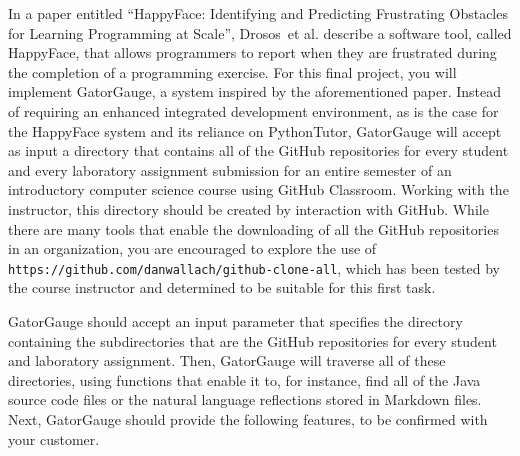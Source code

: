\documentclass[11pt]{article}
\newcommand{\etal}{et al.\xspace}
\newcommand{\url}[1]{\lstinline{#1}}
\begin{document}
In a paper entitled ``HappyFace: Identifying and Predicting Frustrating Obstacles for Learning Programming at Scale'',
Drosos~\etal{} describe a software tool, called HappyFace, that allows programmers to report when they are frustrated
during the completion of a programming exercise. For this final project, you will implement GatorGauge, a system
inspired by the aforementioned paper. Instead of requiring an enhanced integrated development environment, as is the
case for the HappyFace system and its reliance on PythonTutor, GatorGauge will accept as input a directory that contains
all of the GitHub repositories for every student and every laboratory assignment submission for an entire semester of an
introductory computer science course using GitHub Classroom. Working with the instructor, this directory should be
created by interaction with GitHub. While there are many tools that enable the downloading of all the GitHub
repositories in an organization, you are encouraged to explore the use of
\url{https://github.com/danwallach/github-clone-all}, which has been tested by the course instructor and determined to
be suitable for this first task.

GatorGauge should accept an input parameter that specifies the directory containing the subdirectories that are the
GitHub repositories for every student and laboratory assignment. Then, GatorGauge will traverse all of these
directories, using functions that enable it to, for instance, find all of the Java source code files or the natural
language reflections stored in Markdown files. Next, GatorGauge should provide the following features, to be confirmed
with your customer.
\end{document}
